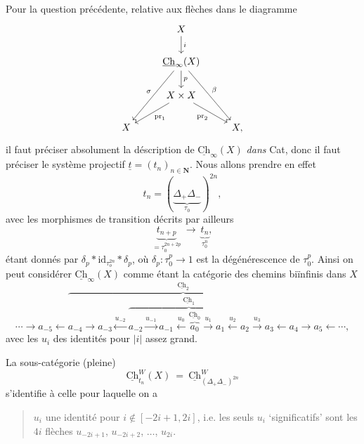 \documentclass[11pt]{article}
\newcommand{\printedpage}[1]{\marginpar{\footnotesize p.~#1}}
\newcommand{\Ch}{\underline{\mathrm{Ch}}}
\begin{document}
Pour la question précédente, relative aux flèches dans le diagramme
\[
\begin{tikzcd}
& X \arrow[d, "i"] & \\
& \Ch_{\infty}(X) \arrow[d, "p"] \arrow[ddl, "\sigma"'] \arrow[ddr, "\beta"] & \\
& X \times X \arrow[dl, "\mathrm{pr}_1"] \arrow[dr, "\mathrm{pr}_2"'] & \\
X & & X,
\end{tikzcd}
\]
il faut préciser absolument la déscription de $\Ch_{\infty}(X)$ \textit{dans} Cat, donc il faut préciser le système projectif $\underline{t} = (t_n)_{n \in \mathbf{N}}$. Nous allons prendre en effet %
\[
t_n = (\underbrace{\Delta_+ \Delta_-}_{\tau_0})^{2n},
\]
avec les morphismes de transition décrits par ailleurs
\[
\underbrace{t_{n+p}}_{=\tau_0^{2n+2p}} \ \longrightarrow \ \underbrace{t_n}_{\tau_0^{n}}, %
\]
\printedpage{91}
étant donnés par $\delta_p * \mathrm{id}_{\tau_o^{2n}} * \delta_p$, où $\delta_p : \tau_0^p \longrightarrow 1$ est la dégénérescence de $\tau_0^p$. Ainsi on peut considérer $\Ch_{\infty}(X)$ comme étant la catégorie des chemins biïnfinis dans $X$ %
\[
\cdots \longrightarrow a_{-5} \longleftarrow \overbrace{a_{-4} \longrightarrow a_{-3} \xleftarrow{u_{-2}} \overbrace{a_{-2} \xrightarrow{u_{-1}} a_{-1} \xleftarrow{u_0} \overbrace{a_0}^{\Ch_0} \xrightarrow{u_1} a_1 \xleftarrow{u_2} a_2}^{\Ch_1} \xrightarrow{u_3} a_3 \longleftarrow a_4}^{\Ch_2} \longrightarrow a_5 \longleftarrow \cdots,
\]
avec les $u_i$ des identités pour $|i|$ assez grand.

La sous-catégorie (pleine)
\[
\Ch^{W}_{t_n}(X) \ = \ \Ch^{W}_{(\Delta_+\Delta_-)^{2n}}
\]
s'identifie à celle pour laquelle on a
\begin{quote}
$u_i$ une identité pour $i \notin [-2i+1, 2i]$, i.e. les seuls $u_i$ `significatifs' sont les $4i$ flèches $u_{-2i+1}$, $u_{-2i+2}$, $\ldots$, $u_{2i}$. %
\end{quote}
\end{document}
